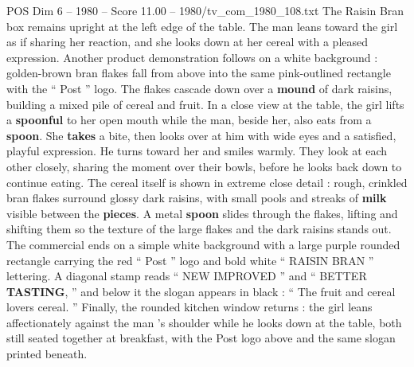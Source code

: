\begin{textsample}{POS Dim 6 – 1980 – Score 11.00 – 1980/tv\_com\_1980\_108.txt}
The Raisin Bran box remains upright at the left edge of the table.
The man leans toward the girl as if sharing her reaction, and she looks down at her cereal with a pleased expression.
Another product demonstration follows on a white background : golden-brown bran flakes fall from above into the same pink-outlined rectangle with the “ Post ” logo.
The flakes cascade down over a \textbf{mound} of dark raisins, building a mixed pile of cereal and fruit.
In a close view at the table, the girl lifts a \textbf{spoonful} to her open mouth while the man, beside her, also eats from a \textbf{spoon}.
She \textbf{takes} a bite, then looks over at him with wide eyes and a satisfied, playful expression.
He turns toward her and smiles warmly.
They look at each other closely, sharing the moment over their bowls, before he looks back down to continue eating.
The cereal itself is shown in extreme close detail : rough, crinkled bran flakes surround glossy dark raisins, with small pools and streaks of \textbf{milk} visible between the \textbf{pieces}.
A metal \textbf{spoon} slides through the flakes, lifting and shifting them so the texture of the large flakes and the dark raisins stands out.
The commercial ends on a simple white background with a large purple rounded rectangle carrying the red “ Post ” logo and bold white “ RAISIN BRAN ” lettering.
A diagonal stamp reads “ NEW IMPROVED ” and “ BETTER \textbf{TASTING}, ” and below it the slogan appears in black : “ The fruit and cereal lovers cereal. ” Finally, the rounded kitchen window returns : the girl leans affectionately against the man ’s shoulder while he looks down at the table, both still seated together at breakfast, with the Post logo above and the same slogan printed beneath.

\end{textsample}
